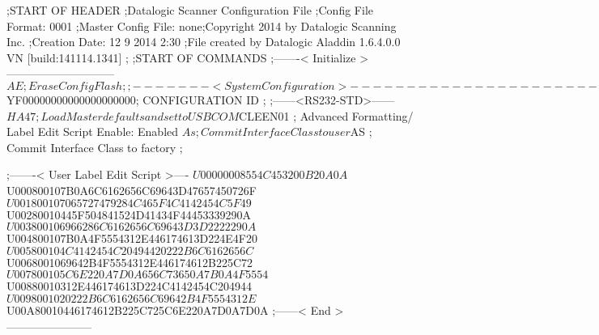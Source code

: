 ;START OF HEADER
;Datalogic Scanner Configuration File
;Config File Format: 0001
;Master Config File: none;Copyright 2014 by Datalogic Scanning Inc.
;Creation Date: 12 9 2014 2:30
;File created by Datalogic Aladdin 1.6.4.0.0 VN [build:141114.1341]
;
;START OF COMMANDS
;-------< Initialize >-----------------------------
$AE                 ; Erase Config Flash
;
;-------< System Configuration >-------------------------------
$YF00000000000000000000; CONFIGURATION ID
;
;------<RS232-STD>------
$HA47               ; Load Master defaults and set to USBCOM
$CLEEN01            ; Advanced Formatting/ Label Edit Script Enable: Enabled
$As                 ; Commit Interface Class to user
$AS                 ; Commit Interface Class to factory
;

;-------< User Label Edit Script >----
$U00000008554C453200B20A0A
$U000800107B0A6C6162656C69643D47657450726F
$U001800107065727479284C465F4C4142454C5F49
$U00280010445F504841524D41434F44453339290A
$U003800106966286C6162656C69643D3D2222290A
$U004800107B0A4F5554312E446174613D224E4F20
$U005800104C4142454C20494420222B6C6162656C
$U0068001069642B4F5554312E446174612B225C72
$U007800105C6E220A7D0A656C73650A7B0A4F5554
$U00880010312E446174613D224C4142454C204944
$U0098001020222B6C6162656C69642B4F5554312E
$U00A80010446174612B225C725C6E220A7D0A7D0A
;------< End >-----------------------
